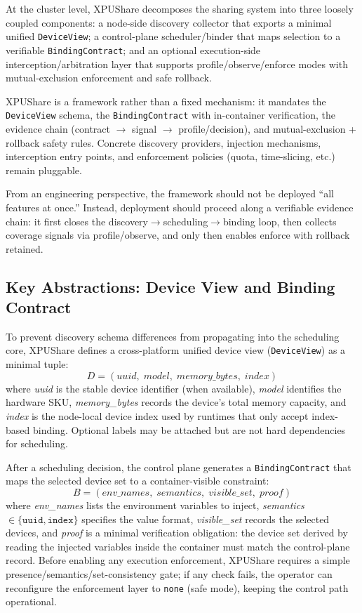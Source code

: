\documentclass[runningheads,a4paper]{llncs}
\begin{document}
At the cluster level, XPUShare decomposes the sharing system into three
loosely coupled components: a node-side discovery collector that exports a minimal unified \texttt{DeviceView}; a control-plane scheduler/binder that maps selection to a verifiable \texttt{BindingContract}; and an optional execution-side
interception/arbitration layer that supports profile/observe/enforce modes
with mutual-exclusion enforcement and safe rollback.

XPUShare is a framework rather than a fixed mechanism: it mandates the
\texttt{DeviceView} schema, the \texttt{BindingContract} with in-container
verification, the evidence chain (contract $\to$ signal $\to$
profile/decision), and mutual-exclusion + rollback safety rules. Concrete
discovery providers, injection mechanisms, interception entry points, and
enforcement policies (quota, time-slicing, etc.) remain pluggable.

From an engineering perspective, the framework should not be deployed
``all features at once.'' Instead, deployment should proceed along a
verifiable evidence chain: it first closes the
discovery$\to$scheduling$\to$binding loop, then collects coverage signals
via profile/observe, and only then enables enforce with rollback retained.

\subsection{Key Abstractions: Device View and Binding Contract}

To prevent discovery schema differences from propagating into the
scheduling core, XPUShare defines a cross-platform unified device view
(\texttt{DeviceView}) as a minimal tuple:
\begin{equation}
D = (\mathit{uuid},\; \mathit{model},\; \mathit{memory\_bytes},\; \mathit{index})
\end{equation}
where \emph{uuid} is the stable device identifier (when available),
\emph{model} identifies the hardware SKU, \emph{memory\_bytes} records the
device's total memory capacity, and \emph{index} is the node-local device
index used by runtimes that only accept index-based binding. Optional
labels may be attached but are not hard dependencies for scheduling.

After a scheduling decision, the control plane generates a
\texttt{BindingContract} that maps the selected device set to a
container-visible constraint:
\begin{equation}
B = (\mathit{env\_names},\; \mathit{semantics},\; \mathit{visible\_set},\; \mathit{proof})
\end{equation}
where \emph{env\_names} lists the environment variables to inject,
\emph{semantics} $\in \{\texttt{uuid}, \texttt{index}\}$ specifies the
value format, \emph{visible\_set} records the selected devices, and
\emph{proof} is a minimal verification obligation: the device set derived
by reading the injected variables inside the container must match the
control-plane record.
Before enabling any execution enforcement, XPUShare requires a simple
presence/semantics/set-consistency gate; if any check fails, the operator
can reconfigure the enforcement layer to \texttt{none} (safe mode),
keeping the control path operational.
\end{document}
